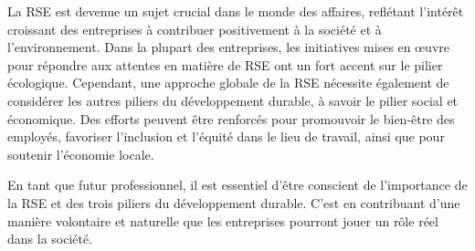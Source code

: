 La RSE est devenue un sujet crucial dans le monde des affaires, reflétant l'intérêt croissant des entreprises à contribuer positivement à la société et à l'environnement.
Dans la plupart des entreprises, les initiatives mises en œuvre pour répondre aux attentes en matière de RSE ont un fort accent sur le pilier écologique.
Cependant, une approche globale de la RSE nécessite également de considérer les autres piliers du développement durable, à savoir le pilier social et économique.
Des efforts peuvent être renforcés pour promouvoir le bien-être des employés, favoriser l'inclusion et l'équité dans le lieu de travail, ainsi que pour soutenir l'économie locale.

En tant que futur professionnel, il est essentiel d'être conscient de l'importance de la RSE et des trois piliers du développement durable.
C'est en contribuant d'une manière volontaire et naturelle que les entreprises pourront jouer un rôle réel dans la société.

